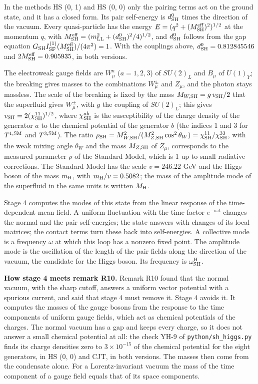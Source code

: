 \documentclass[
  10pt,
]{article}
\begin{document}
In the methods HS (0, 1) and HS (0, 0) only the pairing terms act on the
ground state, and it has a closed form. Its pair self-energy is
\(d^0_{\rm SH}\) times the direction of the vacuum. Every quasi-particle
has the energy \(E=(q^2+(M^{\rm eff}_{\rm SH})^2)^{1/2}\) at the
momentum \(q\), with
\(M^{\rm eff}_{\rm SH}=(m_{\rm LL}^2+(d^0_{\rm SH})^2/4)^{1/2}\), and
\(d^0_{\rm SH}\) follows from the gap equation
\(G_{\rm SH}I^{(1)}_{\rm SF}(M^{\rm eff}_{\rm SH})/(4\pi^2)=1\). With
the couplings above, \(d^0_{\rm SH}=0.812845546\) and
\(2M^{\rm eff}_{\rm SH}=0.905935\), in both versions.

The electroweak gauge fields are \(W^a_\mu\) (\(a=1,2,3\)) of
\(SU(2)_L\) and \(B_\mu\) of \(U(1)_Y\); the breaking gives masses to
the combinations \(W^\pm_\mu\) and \(Z_\mu\), and the photon stays
massless. The scale of the breaking is fixed by the mass
\(M_{W,{\rm SH}}=g\,v_{\rm SH}/2\) that the superfluid gives
\(W^\pm_\mu\), with \(g\) the coupling of \(SU(2)_L\); this gives
\(v_{\rm SH}=2(\chi^{11}_{\rm SH})^{1/2}\), where \(\chi^{ab}_{\rm SH}\)
is the susceptibility of the charge density of the generator \(a\) to
the chemical potential of the generator \(b\) (the indices 1 and 3 for
\(T^{1,{\rm SM}}\) and \(T^{3,{\rm SM}}\)). The ratio
\(\rho_{\rm SH}=M_{W,{\rm SH}}^2/(M_{Z,{\rm SH}}^2\cos^2\theta_W)=\chi^{11}_{\rm SH}/\chi^{33}_{\rm SH}\),
with the weak mixing angle \(\theta_W\) and the mass \(M_{Z,{\rm SH}}\)
of \(Z_\mu\), corresponds to the measured parameter \(\rho\) of the
Standard Model, which is 1 up to small radiative corrections. The
Standard Model has the scale \(v=246.22\) GeV and the Higgs boson of the
mass \(m_{\rm H}\), with \(m_{\rm H}/v=0.5082\); the mass of the
amplitude mode of the superfluid in the same units is written
\(M_{\rm H}\).

Stage 4 computes the modes of this state from the linear response of the
time-dependent mean field. A uniform fluctuation with the time factor
\(e^{-i\omega t}\) changes the normal and the pair self-energies; the
state answers with changes of its local matrices; the contact terms turn
these back into self-energies. A collective mode is a frequency
\(\omega\) at which this loop has a nonzero fixed point. The amplitude
mode is the oscillation of the length of the pair fields along the
direction of the vacuum, the candidate for the Higgs boson. Its
frequency is \(\omega^{\rm H}_{\rm SH}\).

\textbf{How stage 4 meets remark R10.} Remark R10 found that the normal
vacuum, with the sharp cutoff, answers a uniform vector potential with a
spurious current, and said that stage 4 must remove it. Stage 4 avoids
it. It computes the masses of the gauge bosons from the response to the
time components of uniform gauge fields, which act as chemical
potentials of the charges. The normal vacuum has a gap and keeps every
charge, so it does not answer a small chemical potential at all: the
check YH-9 of \texttt{python/sh\_higgs.py} finds its charge densities
zero to \(3\times10^{-15}\) of the chemical potential for the eight
generators, in HS (0, 0) and CJT, in both versions. The masses then come
from the condensate alone. For a Lorentz-invariant vacuum the mass of
the time component of a gauge field equals that of its space components.
\end{document}
